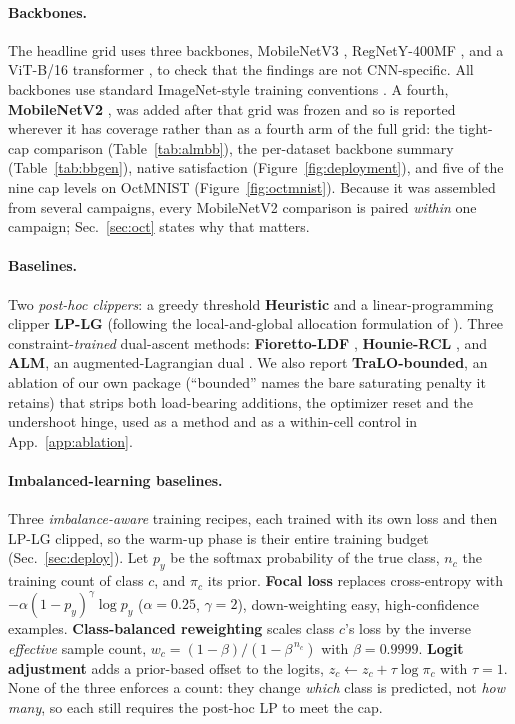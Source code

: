 \documentclass[10pt]{article}
\begin{document}
\paragraph{Backbones.}
The headline grid uses three backbones, MobileNetV3
\citep{howard2019searching}, RegNetY-400MF \citep{radosavovic2020designing},
and a ViT-B/16 transformer \citep{dosovitskiy2020image}, to check that the
findings are not CNN-specific. All backbones use standard ImageNet-style
training conventions \citep{he2016deep}.
{A fourth, \textbf{MobileNetV2} \citep{sandler2018mobilenetv2}, was
added after that grid was frozen and so is reported wherever it has coverage
rather than as a fourth arm of the full grid: the tight-cap comparison
(Table~\ref{tab:almbb}), the per-dataset backbone summary
(Table~\ref{tab:bbgen}), native satisfaction (Figure~\ref{fig:deployment}), and
five of the nine cap levels on OctMNIST (Figure~\ref{fig:octmnist}). Because it
was assembled from several campaigns, every MobileNetV2 comparison is paired
\emph{within} one campaign; Sec.~\ref{sec:oct} states why that matters.}

\paragraph{Baselines.}
Two \emph{post-hoc clippers}: a greedy threshold \textbf{Heuristic} and a
linear-programming clipper \textbf{LP-LG} (following the local-and-global
allocation formulation of \citealt{shifman2025classification}). %
{Three}
constraint-\emph{trained} dual-ascent
methods: \textbf{Fioretto-LDF} \citep{fioretto2020lagrangian}%
{,}
\textbf{Hounie-RCL} \citep{hounie2023resilient}{, and \textbf{ALM},
an augmented-Lagrangian dual \citep{bertsekas1982constrained}}. We also report
\textbf{TraLO-bounded}, an ablation of our own package (``bounded'' names
the bare saturating penalty it retains) that strips both load-bearing
additions, the optimizer reset and the undershoot hinge, used as a method
and as a within-cell control in App.~\ref{app:ablation}.

{
\paragraph{Imbalanced-learning baselines.}
Three \emph{imbalance-aware} training recipes, each trained with its own loss and then
LP-LG clipped, so the warm-up phase is their entire training budget
(Sec.~\ref{sec:deploy}). Let $p_y$ be the softmax probability of the true class, $n_c$
the training count of class $c$, and $\pi_c$ its prior. \textbf{Focal loss}
\citep{lin2017focal} replaces cross-entropy with
$-\alpha(1-p_y)^{\gamma}\log p_y$ ($\alpha{=}0.25$, $\gamma{=}2$), {down-weighting easy, high-confidence examples.} \textbf{Class-balanced reweighting}
\citep{cui2019class} scales class $c$'s loss by the inverse \emph{effective} sample
count, $w_c = (1-\beta)/(1-\beta^{\,n_c})$ with $\beta{=}0.9999$.
\textbf{Logit adjustment} \citep{menon2020long} adds a prior-based offset to the logits,
$z_c \leftarrow z_c + \tau\log\pi_c$ with $\tau{=}1$. None of the three enforces a count: they change
\emph{which} class is predicted, not \emph{how many}, so each still requires the post-hoc
LP to meet the cap.}
\end{document}
